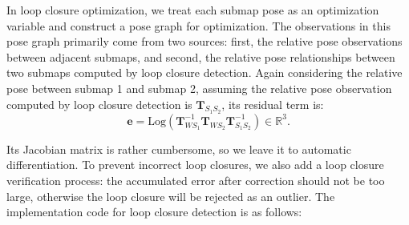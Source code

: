 In loop closure optimization, we treat each submap pose as an optimization variable and construct a pose graph for optimization. The observations in this pose graph primarily come from two sources: first, the relative pose observations between adjacent submaps, and second, the relative pose relationships between two submaps computed by loop closure detection. Again considering the relative pose between submap 1 and submap 2, assuming the relative pose observation computed by loop closure detection is $\mathbf{T}_{S_1 S_2}$, its residual term is:
\begin{equation}\label{key}
	\mathbf{e} = \mathrm{Log}( \mathbf{T}_{W S_1}^{-1} \mathbf{T}_{W S_2} \mathbf{T}_{S_1 S_2}^{-1}) \in \mathbb{R}^3.
\end{equation}

Its Jacobian matrix is rather cumbersome, so we leave it to automatic differentiation. To prevent incorrect loop closures, we also add a loop closure verification process: the accumulated error after correction should not be too large, otherwise the loop closure will be rejected as an outlier. The implementation code for loop closure detection is as follows:

